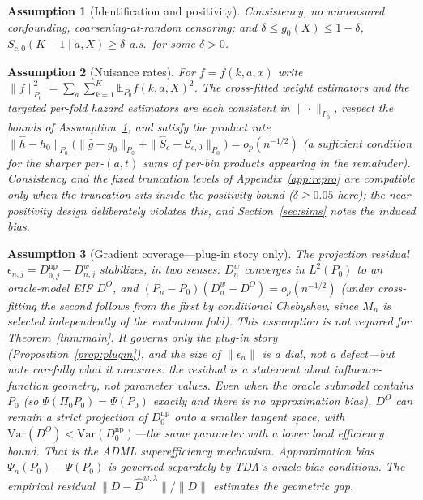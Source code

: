 \documentclass[11pt]{article}
\newtheorem{assumption}{Assumption}
\theoremstyle{remark}
\newcommand{\E}{\mathbb{E}}
\newcommand{\Pn}{P_n}
\begin{document}
\begin{assumption}[Identification and positivity]\label{a:id}
Consistency, no unmeasured confounding, coarsening-at-random censoring; and $\delta \le g_0(X) \le 1-\delta$, $S_{c,0}(K-1\mid a, X)\ge\delta$ a.s.\ for some $\delta>0$.
\end{assumption}
\begin{assumption}[Nuisance rates]\label{a:rates}
For $f = f(k, a, x)$ write $\|f\|_{P_0}^2 = \sum_{a}\sum_{k=1}^{K} \E_{P_0} f(k,a,X)^2$. The cross-fitted weight estimators and the \emph{targeted} per-fold hazard estimators are each consistent in $\|\cdot\|_{P_0}$, respect the bounds of Assumption~\ref{a:id}, and satisfy the product rate $\|\hat h - h_0\|_{P_0}\big(\|\hat g - g_0\|_{P_0} + \|\hat S_c - S_{c,0}\|_{P_0}\big) = o_p(n^{-1/2})$ (a sufficient condition for the sharper per-$(a,t)$ sums of per-bin products appearing in the remainder). Consistency and the fixed truncation levels of Appendix~\ref{app:repro} are compatible only when the truncation sits inside the positivity bound ($\delta \ge 0.05$ here); the near-positivity design deliberately violates this, and Section~\ref{sec:sims} notes the induced bias.
\end{assumption}
\begin{assumption}[Gradient coverage---plug-in story only]\label{a:span}
The projection residual $\epsilon_{n,j} = D^{\mathrm{np}}_{0,j} - D^{w}_{n,j}$ stabilizes, in two senses: $D^{w}_n$ converges in $L^2(P_0)$ to an oracle-model EIF $D^{O}$, and $(\Pn - P_0)(D^{w}_n - D^{O}) = o_p(n^{-1/2})$ (under cross-fitting the second follows from the first by conditional Chebyshev, since $M_n$ is selected independently of the evaluation fold). \emph{This assumption is not required for Theorem~\ref{thm:main}.} It governs only the plug-in story (Proposition~\ref{prop:plugin}), and the size of $\|\epsilon_n\|$ is a dial, not a defect---but note carefully what it measures: the residual is a statement about influence-function \emph{geometry}, not parameter values. Even when the oracle submodel contains $P_0$ (so $\Psi(\Pi_0 P_0) = \Psi(P_0)$ exactly and there is no approximation bias), $D^{O}$ can remain a strict projection of $D^{\mathrm{np}}_0$ onto a smaller tangent space, with $\mathrm{Var}(D^{O}) < \mathrm{Var}(D^{\mathrm{np}}_0)$---the same parameter with a lower local efficiency bound. That is the ADML superefficiency mechanism. Approximation bias $\Psi_n(P_0) - \Psi(P_0)$ is governed separately by TDA's oracle-bias conditions. The empirical residual $\|D - \widehat D^{w,\lambda}\|/\|D\|$ estimates the geometric gap.
\end{assumption}
\end{document}
